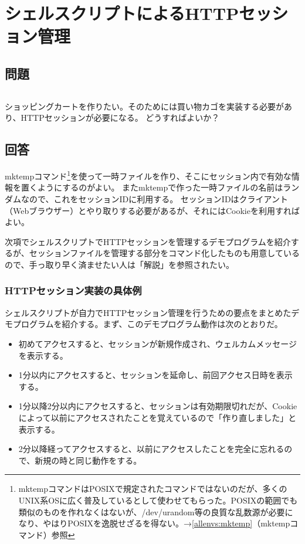 \section{シェルスクリプトによるHTTPセッション管理}
\label{recipe:HTTP_session}

\subsection*{問題}
\noindent
$\!\!\!\!\!$
\begin{grshfboxit}{160.0mm}
	ショッピングカートを作りたい。そのためには買い物カゴを実装する必要があり、HTTPセッションが必要になる。
	どうすればよいか？
\end{grshfboxit}

\subsection*{回答}
mktempコマンド\footnote{mktempコマンドはPOSIXで規定されたコマンドではないのだが、多くのUNIX系OSに広く普及しているとして使わせてもらった。POSIXの範囲でも類似のものを作れなくはないが、/dev/urandom等の良質な乱数源が必要になり、やはりPOSIXを逸脱せざるを得ない。→\ref{allenvs:mktemp}（mktempコマンド）参照}を使って一時ファイルを作り、そこにセッション内で有効な情報を置くようにするのがよい。
またmktempで作った一時ファイルの名前はランダムなので、これをセッションIDに利用する。
セッションIDはクライアント（Webブラウザー）とやり取りする必要があるが、それにはCookieを利用すればよい。

次項でシェルスクリプトでHTTPセッションを管理するデモプログラムを紹介するが、セッションファイルを管理する部分をコマンド化したものも用意しているので、手っ取り早く済ませたい人は「解説」を参照されたい。

\subsubsection*{HTTPセッション実装の具体例}

シェルスクリプトが自力でHTTPセッション管理を行うための要点をまとめたデモプログラムを紹介する。まず、このデモプログラム動作は次のとおりだ。
\begin{itemize}
  \item 初めてアクセスすると、セッションが新規作成され、ウェルカムメッセージを表示する。
  \item 1分以内にアクセスすると、セッションを延命し、前回アクセス日時を表示する。
  \item 1分以降2分以内にアクセスすると、セッションは有効期限切れだが、Cookieによって以前にアクセスされたことを覚えているので「作り直しました」と表示する。
  \item 2分以降経ってアクセスすると、以前にアクセスしたことを完全に忘れるので、新規の時と同じ動作をする。
\end{itemize}

